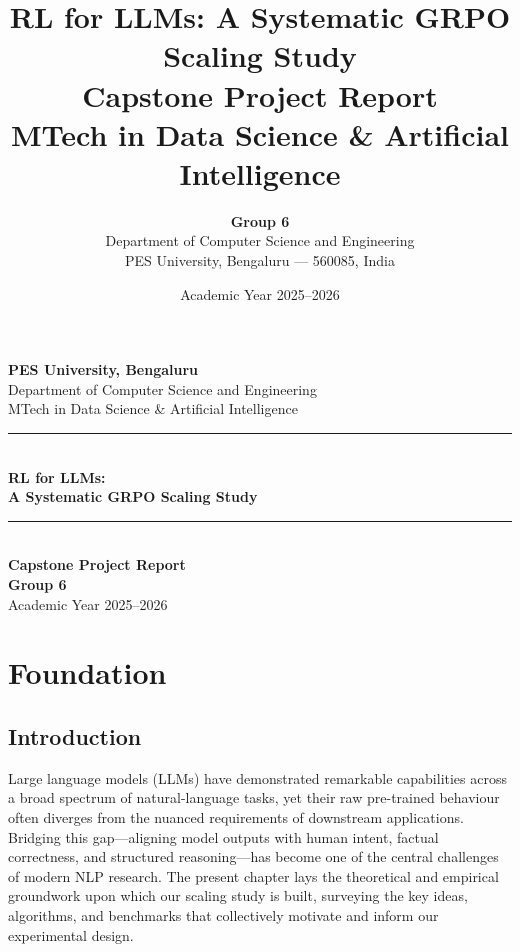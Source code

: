 \documentclass[12pt,a4paper]{report}
\title{%
  \vspace{-1cm}
  \textbf{RL for LLMs: A Systematic GRPO Scaling Study} \\[1.5em]
  \large Capstone Project Report \\[0.8em]
  \large MTech in Data Science \& Artificial Intelligence
}
\author{%
  \textbf{Group 6} \\[1em]
  Department of Computer Science and Engineering \\
  PES University, Bengaluru --- 560085, India
}
\date{Academic Year 2025--2026}
\begin{document}
\begin{titlepage}
  \centering
  \vspace*{1.5cm}

  {\LARGE\bfseries PES University, Bengaluru}\\[0.4cm]
  {\large Department of Computer Science and Engineering}\\[0.3cm]
  {\large MTech in Data Science \& Artificial Intelligence}\\[2.5cm]

  \rule{\textwidth}{1.2pt}\\[0.5cm]
  {\Huge\bfseries RL for LLMs:\\[0.3em]
   A Systematic GRPO Scaling Study}\\[0.5cm]
  \rule{\textwidth}{1.2pt}\\[2cm]

  {\Large\textbf{Capstone Project Report}}\\[1.5cm]

  {\large\textbf{Group 6}}\\[2.5cm]

  \vfill
  {\large Academic Year 2025--2026}
\end{titlepage}

\setcounter{chapter}{1}          %
\chapter{Foundation}
\label{ch:foundation}

\section{Introduction}
\label{sec:foundation-intro}

Large language models (LLMs) have demonstrated remarkable capabilities across
a broad spectrum of natural-language tasks, yet their raw pre-trained behaviour
often diverges from the nuanced requirements of downstream applications.
Bridging this gap---aligning model outputs with human intent, factual
correctness, and structured reasoning---has become one of the central
challenges of modern NLP research.  The present chapter lays the theoretical
and empirical groundwork upon which our scaling study is built, surveying the
key ideas, algorithms, and benchmarks that collectively motivate and inform
our experimental design.
\end{document}
